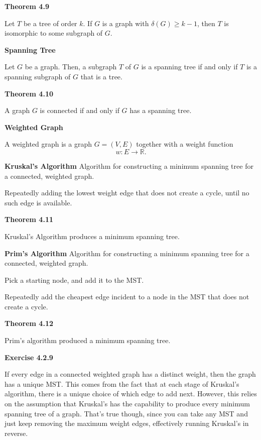\documentclass{article}
\begin{document}
\medskip\noindent\textbf{Theorem 4.9}

    Let $T$ be a tree of order $k$.
    If $G$ is a graph with $\delta(G) \geq k - 1$, then $T$ is isomorphic to some subgraph of $G$.

\medskip\noindent\textbf{Spanning Tree}

    Let $G$ be a graph. Then, a subgraph $T$ of $G$ is a spanning tree if and only if $T$ is a spanning subgraph of $G$ that is a tree.

\medskip\noindent\textbf{Theorem 4.10}

    A graph $G$ is connected if and only if $G$ has a spanning tree.

\medskip\noindent\textbf{Weighted Graph}

    A weighted graph is a graph $G=(V,E)$ together with a weight function $$w: E \to \mathbb R.$$

\medskip\noindent\textbf{Kruskal's Algorithm}
    Algorithm for constructing a minimum spanning tree for a connected, weighted graph.

    Repeatedly adding the lowest weight edge that does not create a cycle, until no such edge is available.

\medskip\noindent\textbf{Theorem 4.11}

    Kruskal's Algorithm produces a minimum spanning tree.

\medskip\noindent\textbf{Prim's Algorithm}
    Algorithm for constructing a minimum spanning tree for a connected, weighted graph.

    Pick a starting node, and add it to the MST.

    Repeatedly add the cheapest edge incident to a node in the MST that does not create a cycle.

\medskip\noindent\textbf{Theorem 4.12}

    Prim's algorithm produced a minimum spanning tree.

\medskip\noindent\textbf{Exercise 4.2.9}

    If every edge in a connected weighted graph has a distinct weight, then the graph has a unique MST.
    This comes from the fact that at each stage of Kruskal's algorithm, there is a unique choice of which edge to add next.
    However, this relies on the assumption that Kruskal's has the capability to produce every minimum spanning tree of a graph.
    That's true though, since you can take any MST and just keep removing the maximum weight edges, effectively running Kruskal's in reverse.
\end{document}
